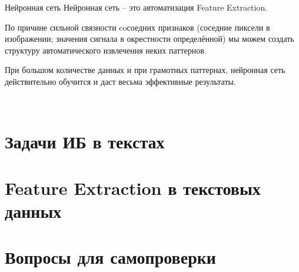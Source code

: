 \begin{frame}{Нейронная сеть}
	Нейронная сеть -- это автоматизация Feature Extraction.
	
	По причине сильной связности coсоедних признаков
	(соседние пиксели в изображении; значения сигнала в окрестности определённой)
	мы можем создать структуру автоматического извлечения неких паттернов.
	
	При большом количестве данных и при грамотных паттернах, нейронная сеть
	действительно обучится и даст весьма эффективные результаты.
	
	\
\end{frame}

\section{Задачи ИБ в текстах}\label{section:text_tasks}

\begin{frame}
	
\end{frame}

\section{Feature Extraction в текстовых данных}\label{section:texts_fe}


\section{Вопросы для самопроверки}

